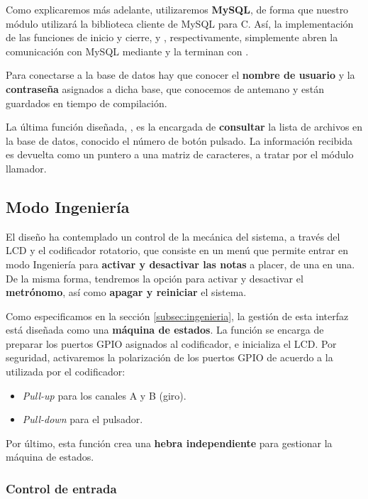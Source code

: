 Como explicaremos más adelante, utilizaremos \textbf{MySQL}, de forma que nuestro módulo utilizará la biblioteca cliente de MySQL para C. Así, la implementación de las funciones de inicio y cierre,  y , respectivamente, simplemente abren la comunicación con MySQL mediante  y la terminan con .

Para conectarse a la base de datos hay que conocer el \textbf{nombre de usuario} y la \textbf{contraseña} asignados a dicha base, que conocemos de antemano y están guardados en tiempo de compilación.

La última función diseñada, , es la encargada de \textbf{consultar} la lista de archivos en la base de datos, conocido el número de botón pulsado. La información recibida es devuelta como un puntero a una matriz de caracteres, a tratar por el módulo llamador.

\subsection{Modo Ingeniería}

El diseño ha contemplado un control de la mecánica del sistema, a través del \acrshort{LCD} y el codificador rotatorio, que consiste en un menú que permite entrar en modo Ingeniería para \textbf{activar y desactivar las notas} a placer, de una en una. De la misma forma, tendremos la opción para activar y desactivar el \textbf{metrónomo}, así como \textbf{apagar y reiniciar} el sistema.

Como especificamos en la sección \ref{subsec:ingenieria}, la gestión de esta interfaz está diseñada como una \textbf{máquina de estados}. La función  se encarga de preparar los puertos \acrshort{GPIO} asignados al codificador, e inicializa el \acrshort{LCD}. Por seguridad, activaremos la polarización de los puertos \acrshort{GPIO} de acuerdo a la utilizada por el codificador:

\begin{itemize}
	\item \textit{Pull-up} para los canales A y B (giro).
	\item \textit{Pull-down} para el pulsador.
\end{itemize}

Por último, esta función crea una \textbf{hebra independiente} para gestionar la máquina de estados.

\subsubsection{Control de entrada}

